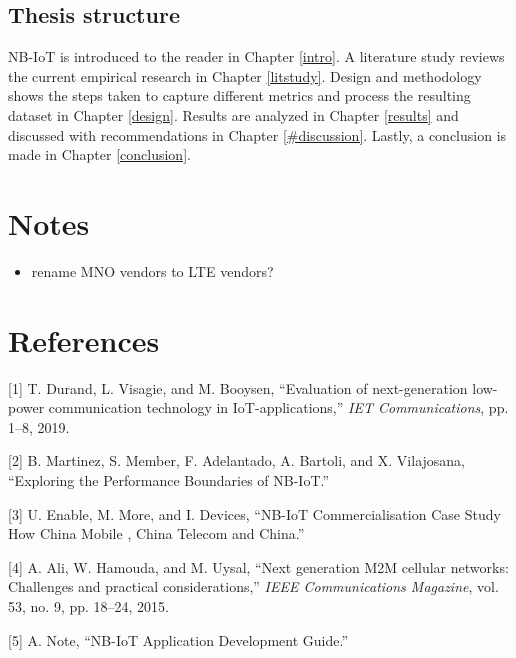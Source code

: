 \documentclass[]{article}
\providecommand{\tightlist}{%
  \setlength{\itemsep}{0pt}\setlength{\parskip}{0pt}}
\begin{document}
\hypertarget{thesis-struct}{%
\subsection{Thesis structure}\label{thesis-struct}}

NB-IoT is introduced to the reader in Chapter \ref{intro}. A literature
study reviews the current empirical research in Chapter \ref{litstudy}.
Design and methodology shows the steps taken to capture different
metrics and process the resulting dataset in Chapter \ref{design}.
Results are analyzed in Chapter \ref{results} and discussed with
recommendations in Chapter \ref{#discussion}. Lastly, a conclusion is
made in Chapter \ref{conclusion}.

\newpage

\hypertarget{notes}{%
\section{Notes}\label{notes}}

\begin{itemize}
\tightlist
\item
  rename MNO vendors to LTE vendors?
\end{itemize}

\newpage

\hypertarget{references}{%
\section*{References}\label{references}}

\hypertarget{refs}{}
\leavevmode\hypertarget{ref-Durand2019}{}%
{[}1{]} T. Durand, L. Visagie, and M. Booysen, ``Evaluation of
next-generation low-power communication technology in
IoT-applications,'' \emph{IET Communications}, pp. 1--8, 2019.

\leavevmode\hypertarget{ref-Martinez2019}{}%
{[}2{]} B. Martinez, S. Member, F. Adelantado, A. Bartoli, and X.
Vilajosana, ``Exploring the Performance Boundaries of NB-IoT.''

\leavevmode\hypertarget{ref-china2019}{}%
{[}3{]} U. Enable, M. More, and I. Devices, ``NB-IoT Commercialisation
Case Study How China Mobile , China Telecom and China.''

\leavevmode\hypertarget{ref-Ali2015}{}%
{[}4{]} A. Ali, W. Hamouda, and M. Uysal, ``Next generation M2M cellular
networks: Challenges and practical considerations,'' \emph{IEEE
Communications Magazine}, vol. 53, no. 9, pp. 18--24, 2015.

\leavevmode\hypertarget{ref-ubloxAppNote2018}{}%
{[}5{]} A. Note, ``NB-IoT Application Development Guide.''
\end{document}
